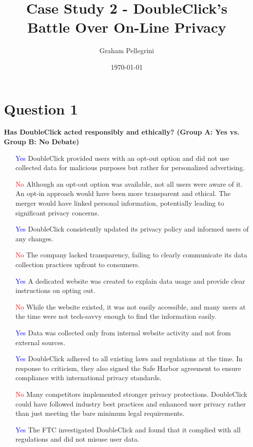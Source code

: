 \documentclass[12pt]{article}
\title{Case Study 2 - DoubleClick’s Battle Over On-Line Privacy}
\author{Graham Pellegrini }
\date{\today}
\begin{document}
\maketitle
\section*{Question 1}
\textbf{Has DoubleClick acted responsibly and ethically? (Group A: Yes vs. Group B: No Debate)}

\begin{itemize}
    \item [\textcolor{blue}{Yes}] DoubleClick provided users with an opt-out option and did not use collected data for malicious purposes but rather for personalized advertising.  
    \item [\textcolor{red}{No}] Although an opt-out option was available, not all users were aware of it. An opt-in approach would have been more transparent and ethical. The merger would have linked personal information, potentially leading to significant privacy concerns.  
    \item [\textcolor{blue}{Yes}] DoubleClick consistently updated its privacy policy and informed users of any changes.  
    \item [\textcolor{red}{No}] The company lacked transparency, failing to clearly communicate its data collection practices upfront to consumers.  
    \item [\textcolor{blue}{Yes}] A dedicated website was created to explain data usage and provide clear instructions on opting out.  
    \item [\textcolor{red}{No}] While the website existed, it was not easily accessible, and many users at the time were not tech-savvy enough to find the information easily.  
    \item [\textcolor{blue}{Yes}] Data was collected only from internal website activity and not from external sources.  
    \item [\textcolor{blue}{Yes}] DoubleClick adhered to all existing laws and regulations at the time. In response to criticism, they also signed the Safe Harbor agreement to ensure compliance with international privacy standards.  
    \item [\textcolor{red}{No}] Many competitors implemented stronger privacy protections. DoubleClick could have followed industry best practices and enhanced user privacy rather than just meeting the bare minimum legal requirements.  
    \item [\textcolor{blue}{Yes}] The FTC investigated DoubleClick and found that it complied with all regulations and did not misuse user data.  

\end{itemize}
\end{document}
